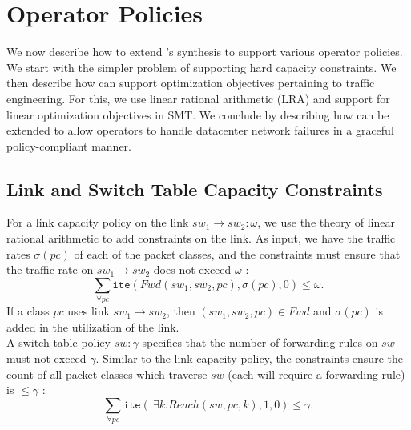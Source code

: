 \section{Operator Policies}
\label{sec:optimization}

We now describe how to extend \Name's synthesis to support various
operator policies.  We start with the simpler problem of supporting
hard capacity constraints. We then describe how \Name can support
optimization objectives pertaining to traffic engineering. For this, 
we use linear rational arithmetic (LRA) and support for linear
optimization objectives in SMT. We conclude by describing how \Name can be
extended to allow operators to handle datacenter network failures in a
graceful policy-compliant manner.

\subsection{Link and Switch Table Capacity Constraints} \label{sec:linkcap}
For a link capacity policy on the link $sw_1 \rightarrow sw_2: \omega$, 
we use the theory of linear rational arithmetic 
to add constraints on the link. As input, we have the traffic rates $\sigma(pc)$ of
each of the packet classes, and the constraints must ensure that the traffic rate on $sw_1 \rightarrow sw_2$
does not exceed $\omega$ :
\begin{equation}
 \sum_{\forall pc} \texttt{ite}(Fwd(sw_1,sw_2, pc), \sigma(pc), 0) \leq \omega .
\end{equation}
If a class $pc$ uses link $sw_1 \rightarrow sw_2$, then $(sw_1,sw_2, pc) \in Fwd$
and $\sigma(pc)$ is added in the utilization of the link. \\
\noindent A switch table policy $sw : \gamma$ specifies that the number of forwarding 
rules on $sw$ must not exceed $\gamma$. Similar to the link capacity policy,
the constraints ensure the count of all packet classes which traverse $sw$ (each 
will require a forwarding rule) is $\leq \gamma$ :
\begin{equation}
\sum_{\forall pc} \texttt{ite}(~\exists k. Reach(sw,pc,k), 1, 0)  \leq \gamma.
\end{equation}





